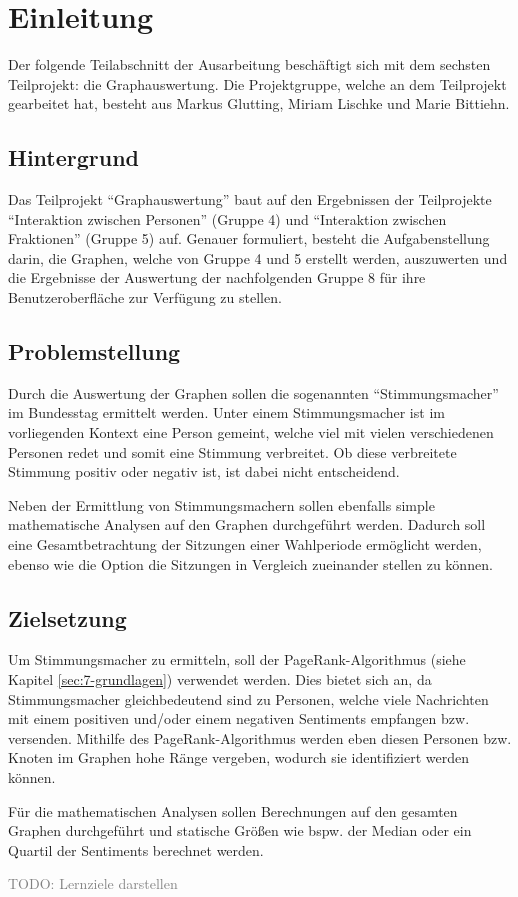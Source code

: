 \section{Einleitung}

Der folgende Teilabschnitt der Ausarbeitung beschäftigt sich mit dem sechsten Teilprojekt: die Graphauswertung. Die Projektgruppe, welche an dem Teilprojekt gearbeitet hat, besteht aus Markus Glutting, Miriam Lischke und Marie Bittiehn.

\subsection{Hintergrund}
Das Teilprojekt ``Graphauswertung'' baut auf den Ergebnissen der Teilprojekte ``Interaktion zwischen Personen'' (Gruppe 4) und ``Interaktion zwischen Fraktionen'' (Gruppe 5) auf. Genauer formuliert, besteht die Aufgabenstellung darin, die Graphen, welche von Gruppe 4 und 5 erstellt werden, auszuwerten und die Ergebnisse der Auswertung der nachfolgenden Gruppe 8 für ihre Benutzeroberfläche zur Verfügung zu stellen.

\subsection{Problemstellung}
Durch die Auswertung der Graphen sollen die sogenannten ``Stimmungsmacher'' im Bundesstag ermittelt werden. Unter einem Stimmungsmacher ist im vorliegenden Kontext eine Person gemeint, welche viel mit vielen verschiedenen Personen redet und somit eine Stimmung verbreitet. Ob diese verbreitete Stimmung positiv oder negativ ist, ist dabei nicht entscheidend. 

Neben der Ermittlung von Stimmungsmachern sollen ebenfalls simple mathematische Analysen auf den Graphen durchgeführt werden. Dadurch soll eine Gesamtbetrachtung der Sitzungen einer Wahlperiode ermöglicht werden, ebenso wie die Option die Sitzungen in Vergleich zueinander stellen zu können.

\subsection{Zielsetzung}

Um Stimmungsmacher zu ermitteln, soll der PageRank-Algorithmus (siehe Kapitel \ref{sec:7-grundlagen}) verwendet werden. Dies bietet sich an, da Stimmungsmacher gleichbedeutend sind zu Personen, welche viele Nachrichten mit einem positiven und/oder einem negativen Sentiments empfangen bzw. versenden. Mithilfe des PageRank-Algorithmus werden eben diesen Personen bzw. Knoten im Graphen hohe Ränge vergeben, wodurch sie identifiziert werden können.

Für die mathematischen Analysen sollen Berechnungen auf den gesamten Graphen durchgeführt und statische Größen wie bspw. der Median oder ein Quartil der Sentiments berechnet werden. 

\textcolor{gray}{TODO: Lernziele darstellen}